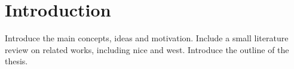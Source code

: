 \chapter{Introduction}
Introduce the main concepts, ideas and motivation. Include a small literature review on related works, including \gls{nice} and \gls{west}. Introduce the outline of the thesis.




